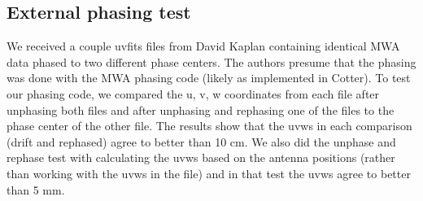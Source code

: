 \documentclass[11pt, oneside]{article}   	%
\begin{document}
\subsection{External phasing test}
We received a couple uvfits files from David Kaplan containing identical MWA data phased to two different phase centers. The authors presume that the phasing was done with the MWA phasing code (likely as implemented in Cotter). To test our phasing code, we compared the u, v, w coordinates from each file after unphasing both files and after unphasing and rephasing one of the files to the phase center of the other file. The results show that the uvws in each comparison (drift and rephased) agree to better than 10 cm. We also did the unphase and rephase test with calculating the uvws based on the antenna positions (rather than working with the uvws in the file) and in that test the uvws agree to better than 5 mm. 
\end{document}
